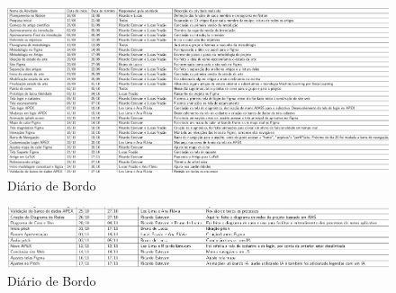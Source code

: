 \documentclass[
  a4paper,%
  12pt,%
  english,%
  brazilian,%
]{article}
\begin{document}
                    \begin{figure}[h]
                    \centering
                    \caption{Diário de Bordo}%
                    \label{fig:D-bordo1}
                     \includegraphics[width=1.1\textwidth]{Logos/loog_book1.png}
                    \end{figure}

                    \newpage
                    
                    \begin{figure}[h]
                        \centering
                        \caption{Diário de Bordo}%
                        \label{fig:D-bordo2}
                         \includegraphics[width=1.1\textwidth]{Logos/loog_book2.png}
                        \end{figure}

                        \newpage
           
    
                    
\end{document}
